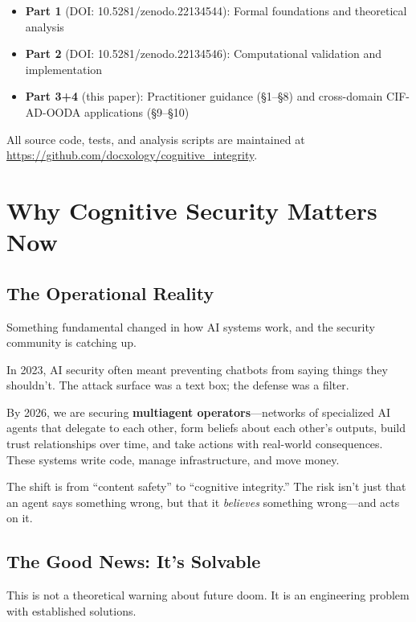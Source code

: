 \documentclass[
]{article}
\providecommand{\tightlist}{%
  \setlength{\itemsep}{0pt}\setlength{\parskip}{0pt}}
\begin{document}
\begin{itemize}
\tightlist
\item
  \textbf{Part 1} (DOI: 10.5281/zenodo.22134544): Formal foundations and
  theoretical analysis
\item
  \textbf{Part 2} (DOI: 10.5281/zenodo.22134546): Computational
  validation and implementation
\item
  \textbf{Part 3+4} (this paper): Practitioner guidance (§1--§8) and
  cross-domain CIF-AD-OODA applications (§9--§10)
\end{itemize}

All source code, tests, and analysis scripts are maintained at
\url{https://github.com/docxology/cognitive_integrity}.

\newpage

\newpage

\section{Why Cognitive Security Matters Now}\label{sec:introduction}

\subsection{The Operational Reality}\label{the-operational-reality}

Something fundamental changed in how AI systems work, and the security
community is catching up.

In 2023, AI security often meant preventing chatbots from saying things
they shouldn't. The attack surface was a text box; the defense was a
filter.

By 2026, we are securing \textbf{multiagent operators}---networks of
specialized AI agents that delegate to each other, form beliefs about
each other's outputs, build trust relationships over time, and take
actions with real-world consequences. These systems write code, manage
infrastructure, and move money.

The shift is from ``content safety'' to ``cognitive integrity.'' The
risk isn't just that an agent says something wrong, but that it
\emph{believes} something wrong---and acts on it.

\subsection{The Good News: It's
Solvable}\label{the-good-news-its-solvable}

This is not a theoretical warning about future doom. It is an
engineering problem with established solutions.
\end{document}
